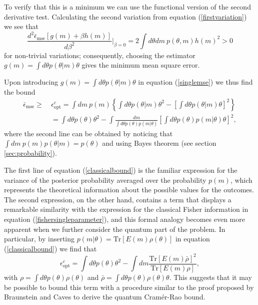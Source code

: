To verify that this is a minimum we can use the functional version of the second derivative test. Calculating the second variation from equation (\ref{firstvariation}) we see that
\begin{equation}
\frac{d^2 \bar{\epsilon}_{\mathrm{mse}}\left[g(m)+\beta h(m)\right]}{d\beta^2} \bigg\rvert_{\beta = 0} = 2 \int d\theta dm~p(\theta, m) h(m)^2 > 0
\end{equation}
for non-trivial variations; consequently, choosing the estimator $g(m) = \int d\theta p(\theta|m) \theta$ gives the minimum mean square error. 

Upon introducing $g(m) = \int d\theta p(\theta|m) \theta$ in equation (\ref{singlemse}) we thus find the bound
\begin{align}
\bar{\epsilon}_{\mathrm{mse}} \geqslant ~& \epsilon_{\mathrm{opt}}^c = \int dm~p(m) \left\lbrace \int d\theta p(\theta|m) \theta^2 -  \left[\int d\theta p(\theta|m) \theta \right]^2 \right\rbrace
\nonumber \\
& = \int d\theta p(\theta) \theta^2  - \int \frac{dm}{\int d\theta p(\theta)p(m|\theta)}\left[\int d\theta p(\theta)p(m|\theta) \theta \right]^2,
\label{classicalbound}
\end{align}
where the second line can be obtained by noticing that $\int dm~p(m) p(\theta|m) = p(\theta)$ and using Bayes theorem (see section \ref{sec:probability}). 

The first line of equation (\ref{classicalbound}) is the familiar expression for the variance of the posterior probability averaged over the probability $p(m)$, which represents the theoretical information about the possible values for the outcomes. The second expression, on the other hand, contains a term that displays a remarkable similarity with the expression for the classical Fisher information in equation (\ref{fishersingleparameter}), and this formal analogy becomes even more apparent when we further consider the quantum part of the problem. In particular, by inserting $p(m|\theta) = \mathrm{Tr}[E(m) \rho(\theta)]$ in equation (\ref{classicalbound}) we find that
\begin{equation}
\epsilon_{\mathrm{opt}}^c = \int d\theta p(\theta)\theta^2 - \int dm  \frac{\mathrm{Tr}\left[ E(m) \bar{\rho} \right]^2}{\mathrm{Tr}\left[ E(m) \rho \right]},
\label{bayesanalogygen}
\end{equation}
with $\rho = \int d\theta p(\theta) \rho(\theta)$ and $\bar{\rho} = \int d\theta p(\theta) \rho(\theta) \theta$. This suggests that it may be possible to bound this term with a procedure similar to the proof proposed by Braunstein and Caves \cite{BraunsteinCaves1994} to derive the quantum Cram\'{e}r-Rao bound.

